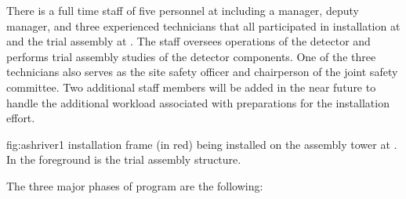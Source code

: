 There is a full time staff of five personnel at 
including a manager, deputy manager, and three experienced technicians
that all participated in  installation at  and
the  trial assembly at .  The staff
oversees operations of the  detector and performs trial
assembly studies of the  detector components.  One of the
three technicians also serves as the site safety officer and
chairperson of the joint safety committee.  Two additional staff
members will be added in the near future to handle the additional
workload associated with preparations for the 
installation effort.

\begin{dunefigure}
  {fig:ashriver1}
  { installation frame (in red) being installed on the
   assembly tower at . In the foreground is
  the  trial assembly structure.}
\end{dunefigure}
The three major phases of  program are the following:
